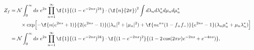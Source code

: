 \begin{equation}
\begin{split}
Z_{f}&={\cal N}\int_{0}^{\infty} ds\ e^{2s}
\prod_{n=1}^{\infty}\f{1}{(1-e^{-2ns})^{24}}\cdot
\left(\f{n}{2\pi}\right)^2\int d\lambda_n d\lambda_n^*
d\mu_n d\mu_n^*\\ 
& \qquad 
\times\exp\Bigl[-\f{n(e^{2ns}+1)}{2(e^{2ns}-1)}(|\lambda_n|^2+|\mu_n|^2)
+\f{ne^{ns}(1-f_+f_-)}{e^{2ns}-1}(\lambda_n\mu_n^*+\mu_n\lambda_n^*)
\Bigr]\\
&={\cal N}\int_{0}^{\infty}
 ds\ e^{2s}\prod_{n=1}^{\infty}\f{1}{(1-e^{-2ns})^{24}}
\cdot\f{(1-e^{-2ns})^2}{(1-2\cos(2\pi\nu) e^{-2ns}+e^{-4ns})},
\end{split}
\end{equation}

